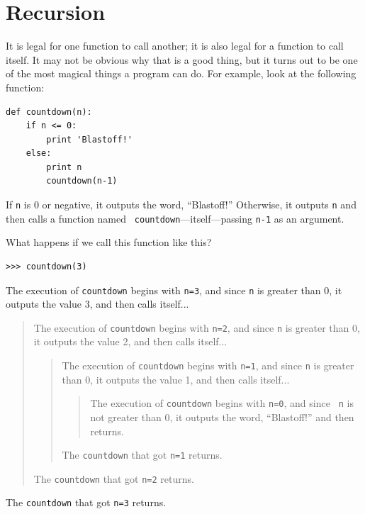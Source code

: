 \documentclass[10pt]{book}
\begin{document}
\section{Recursion}
\label{recursion}

It is legal for one function to call another;
it is also legal for a function to call itself.  It may not be obvious
why that is a good thing, but it turns out to be one of the most
magical things a program can do.
For example, look at the following function:

\beforeverb
\begin{verbatim}
def countdown(n):
    if n <= 0:
        print 'Blastoff!'
    else:
        print n
        countdown(n-1)
\end{verbatim}
\afterverb
%
If {\tt n} is 0 or negative, it outputs the word, ``Blastoff!''
Otherwise, it outputs {\tt n} and then calls a function named {\tt
countdown}---itself---passing {\tt n-1} as an argument.

What happens if we call this function like this?

\beforeverb
\begin{verbatim}
>>> countdown(3)
\end{verbatim}
\afterverb
%
The execution of {\tt countdown} begins with {\tt n=3}, and since
{\tt n} is greater than 0, it outputs the value 3, and then calls itself...

\begin{quote}
The execution of {\tt countdown} begins with {\tt n=2}, and since
{\tt n} is greater than 0, it outputs the value 2, and then calls itself...

\begin{quote}
The execution of {\tt countdown} begins with {\tt n=1}, and since
{\tt n} is greater than 0, it outputs the value 1, and then calls itself...

\begin{quote}
The execution of {\tt countdown} begins with {\tt n=0}, and since {\tt
n} is not greater than 0, it outputs the word, ``Blastoff!'' and then
returns.
\end{quote}

The {\tt countdown} that got {\tt n=1} returns.
\end{quote}

The {\tt countdown} that got {\tt n=2} returns.
\end{quote}

The {\tt countdown} that got {\tt n=3} returns.
\end{document}
